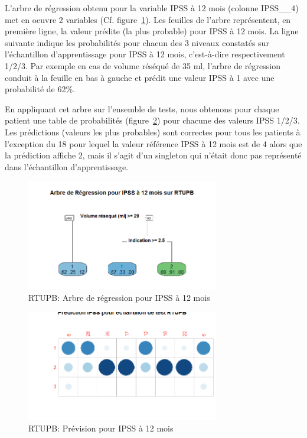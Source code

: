 L'arbre de régression obtenu pour la variable IPSS à 12 mois (colonne IPSS__4) met en oeuvre 2 variables (Cf. figure~\ref{fig-rtupb-regtree-ipss12}). Les feuilles de l'arbre représentent, en première ligne, la valeur prédite (la plus probable) pour IPSS à 12 mois. La ligne suivante indique les probabilités pour chacun des 3 niveaux constatés sur l'échantillon d'apprentissage pour IPSS à 12 mois, c'est-à-dire respectivement 1/2/3. Par exemple en cas de volume réséqué de 35 ml, l'arbre de régression conduit à la feuille en bas à gauche et prédit une valeur IPSS à 1 avec une probabilité de 62\%.

En appliquant cet arbre sur l'ensemble de tests, nous obtenons pour chaque patient une table de probabilités (figure~\ref{fig-rtupb-regtree-predict-ipss12}) pour chacune des valeurs IPSS 1/2/3. Les prédictions (valeurs
les plus probables) sont correctes pour tous les patients à l'exception du 18 pour lequel la valeur référence
IPSS à 12 mois est de 4 alors que la prédiction affiche 2, mais il s'agit d'un singleton qui n'était donc pas représenté dans l'échantillon d'apprentissage.

\begin{figure}[H]
\centering
\includegraphics[width=0.75\textwidth]{../Fig/RTUPB/rtupb-regtree-ipss12.png}
\caption{RTUPB: Arbre de régression pour IPSS à 12 mois}
\label{fig-rtupb-regtree-ipss12}
\end{figure}


\begin{figure}[H]
\centering
\includegraphics[width=0.75\textwidth]{../Fig/RTUPB/rtupb-regtree-predict-ipss12.png}
\caption{RTUPB: Prévision pour IPSS à 12 mois}
\label{fig-rtupb-regtree-predict-ipss12}
\end{figure}


